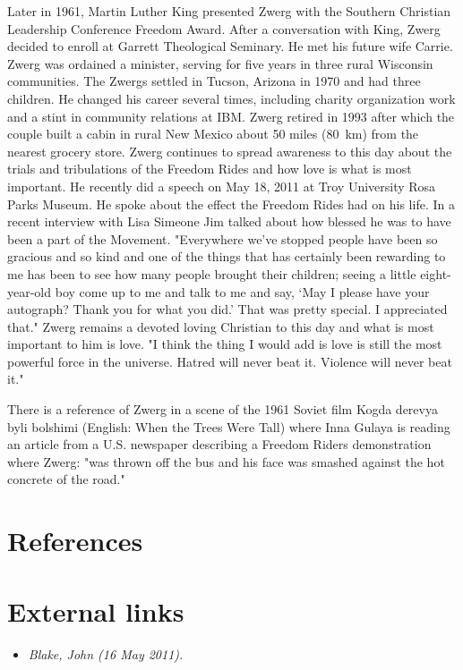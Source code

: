 Later in 1961, Martin Luther King presented Zwerg with the Southern
Christian Leadership Conference Freedom Award. After a conversation with
King, Zwerg decided to enroll at Garrett Theological Seminary. He met
his future wife Carrie. Zwerg was ordained a minister, serving for five
years in three rural Wisconsin communities. The Zwergs settled in
Tucson, Arizona in 1970 and had three children. He changed his career
several times, including charity organization work and a stint in
community relations at IBM. Zwerg retired in 1993 after which the couple
built a cabin in rural New Mexico about 50 miles (80~km) from the
nearest grocery store. Zwerg continues to spread awareness to this day
about the trials and tribulations of the Freedom Rides and how love is
what is most important. He recently did a speech on May 18, 2011 at Troy
University Rosa Parks Museum. He spoke about the effect the Freedom
Rides had on his life. In a recent interview with Lisa Simeone Jim
talked about how blessed he was to have been a part of the Movement.
"Everywhere we've stopped people have been so gracious and so kind and
one of the things that has certainly been rewarding to me has been to
see how many people brought their children; seeing a little
eight-year-old boy come up to me and talk to me and say, `May I please
have your autograph? Thank you for what you did.' That was pretty
special. I appreciated that." Zwerg remains a devoted loving Christian
to this day and what is most important to him is love. "I think the
thing I would add is love is still the most powerful force in the
universe. Hatred will never beat it. Violence will never beat it."

There is a reference of Zwerg in a scene of the 1961 Soviet film Kogda
derevya byli bolshimi (English: When the Trees Were Tall) where Inna
Gulaya is reading an article from a U.S. newspaper describing a Freedom
Riders demonstration where Zwerg: "was thrown off the bus and his face
was smashed against the hot concrete of the road."

\section{References}\label{references}

\section{External links}\label{external-links}

\begin{itemize}
\item
  \emph{Blake, John (16 May 2011).}
\end{itemize}

